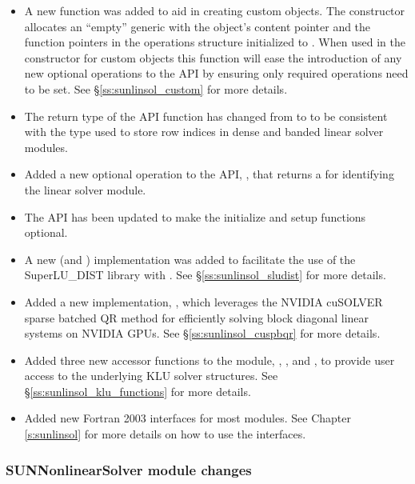 \begin{itemize}
\item A new function was added to aid in creating custom {\sunlinsol} objects.
The constructor  allocates an ``empty'' generic
{\sunlinsol} with the object's content pointer and the function pointers
in the operations structure initialized to . When used in the
constructor for custom objects this function will ease the introduction of any
new optional operations to the {\sunlinsol} API by ensuring only required
operations need to be set. See \S\ref{ss:sunlinsol_custom} for more details.
%
\item The return type of the {\sunlinsol} API function 
has changed from  to  to be consistent with the
type used to store row indices in dense and banded linear solver modules.
%
\item Added a new optional operation to the {\sunlinsol} API,
, that returns a \newline\noindent
{} for identifying the
linear solver module.
%
\item The {\sunlinsol} API has been updated to make the initialize and setup
functions optional.
%
\item A new {\sunlinsol} (and {\sunmatrix}) implementation was added to
facilitate the use of the SuperLU\_DIST library with {\sundials}. See
\S\ref{ss:sunlinsol_sludist} for more details.
%
\item Added a new {\sunlinsol} implementation,
, which leverages the NVIDIA cuSOLVER
sparse batched QR method for efficiently solving block diagonal linear systems
on NVIDIA GPUs. See \S\ref{ss:sunlinsol_cuspbqr} for more details.
%
\item Added three new accessor functions to the {\sunlinsolklu} module,
,
, and
,
to provide user access to the underlying KLU solver structures. See
\S\ref{ss:sunlinsol_klu_functions} for more details.
%
\item Added new Fortran 2003 interfaces for most {\sunlinsol} modules. See
Chapter \ref{s:sunlinsol} for more details on how to use the interfaces.
\end{itemize}

\subsubsection*{SUNNonlinearSolver module changes}

